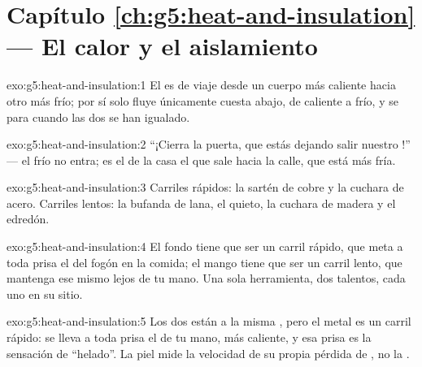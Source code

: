 \section*{Capítulo \ref{ch:g5:heat-and-insulation} --- El calor y el aislamiento}

\begin{solution}{exo:g5:heat-and-insulation:1}
El  es  de viaje desde un cuerpo más caliente
hacia otro más frío; por sí solo fluye únicamente cuesta abajo, de
caliente a frío, y se para cuando las dos  se han
igualado.
\end{solution}

\begin{solution}{exo:g5:heat-and-insulation:2}
``¡Cierra la puerta, que estás dejando salir nuestro !'' --- el
frío no entra; es el  de la casa el que sale hacia la calle,
que está más fría.
\end{solution}

\begin{solution}{exo:g5:heat-and-insulation:3}
Carriles rápidos: la sartén de cobre y la cuchara de acero. Carriles
lentos: la bufanda de lana, el  quieto, la cuchara de madera y el
edredón.
\end{solution}

\begin{solution}{exo:g5:heat-and-insulation:4}
El fondo tiene que ser un carril rápido, que meta a toda prisa el
 del fogón en la comida; el mango tiene que ser un carril
lento, que mantenga ese mismo  lejos de tu mano. Una sola
herramienta, dos talentos, cada uno en su sitio.
\end{solution}

\begin{solution}{exo:g5:heat-and-insulation:5}
Los dos están a la misma , pero el metal es un carril
rápido: se lleva a toda prisa el  de tu mano, más caliente, y
esa prisa es la sensación de ``helado''. La piel mide la velocidad de
su propia pérdida de , no la .
\end{solution}

